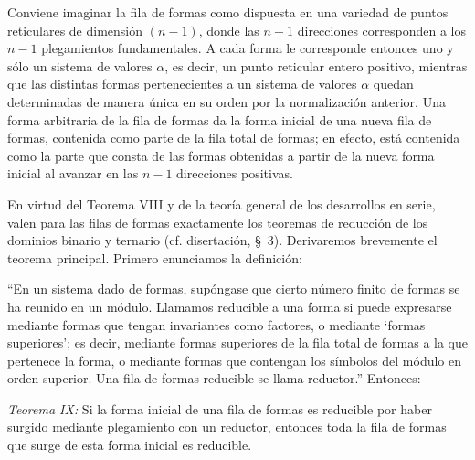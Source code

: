 \documentclass[11pt]{article}
\begin{document}
Conviene imaginar la fila de formas como dispuesta en una variedad de puntos reticulares de dimensión $(n-1)$, donde las $n-1$ direcciones corresponden a los $n-1$ plegamientos fundamentales. A cada forma le corresponde entonces uno y sólo un sistema de valores $\alpha$, es decir, un punto reticular entero positivo, mientras que las distintas formas pertenecientes a un sistema de valores $\alpha$ quedan determinadas de manera única en su orden por la normalización anterior. Una forma arbitraria de la fila de formas da la forma inicial de una nueva fila de formas, contenida como parte de la fila total de formas; en efecto, está contenida como la parte que consta de las formas obtenidas a partir de la nueva forma inicial al avanzar en las $n-1$ direcciones positivas.

En virtud del Teorema VIII y de la teoría general de los desarrollos en serie, valen para las filas de formas exactamente los teoremas de reducción de los dominios binario y ternario (cf. disertación, \S\ 3). Derivaremos brevemente el teorema principal. Primero enunciamos la definición:

``En un sistema dado de formas, supóngase que cierto número finito de formas se ha reunido en un módulo. Llamamos reducible a una forma si puede expresarse mediante formas que tengan invariantes como factores, o mediante `formas superiores'; es decir, mediante formas superiores de la fila total de formas a la que pertenece la forma, o mediante formas que contengan los símbolos del módulo en orden superior. Una fila de formas reducible se llama reductor.'' Entonces:

\emph{Teorema IX:} Si la forma inicial de una fila de formas es reducible por haber surgido mediante plegamiento con un reductor, entonces toda la fila de formas que surge de esta forma inicial es reducible.
\end{document}

